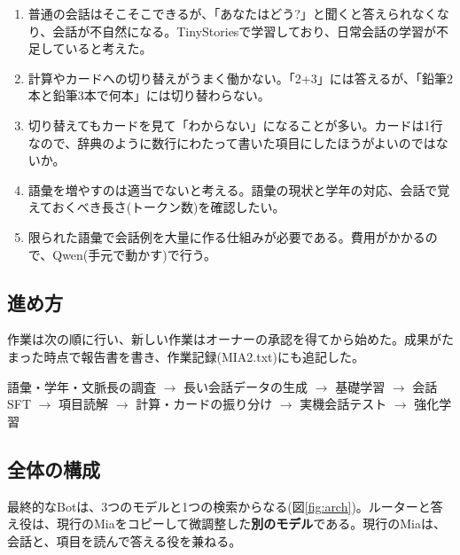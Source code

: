 \documentclass[a4paper,11pt]{article}
\begin{document}
\begin{enumerate}
\item 普通の会話はそこそこできるが、「あなたはどう?」と聞くと答えられなくなり、会話が不自然になる。TinyStoriesで学習しており、日常会話の学習が不足していると考えた。
\item 計算やカードへの切り替えがうまく働かない。「2+3」には答えるが、「鉛筆2本と鉛筆3本で何本」には切り替わらない。
\item 切り替えてもカードを見て「わからない」になることが多い。カードは1行なので、辞典のように数行にわたって書いた項目にしたほうがよいのではないか。
\item 語彙を増やすのは適当でないと考える。語彙の現状と学年の対応、会話で覚えておくべき長さ(トークン数)を確認したい。
\item 限られた語彙で会話例を大量に作る仕組みが必要である。費用がかかるので、Qwen(手元で動かす)で行う。
\end{enumerate}

\subsection{進め方}
作業は次の順に行い、新しい作業はオーナーの承認を得てから始めた。成果がたまった時点で報告書を書き、作業記録(MIA2.txt)にも追記した。
\begin{center}
\small
語彙・学年・文脈長の調査 $\rightarrow$ 長い会話データの生成 $\rightarrow$ 基礎学習 $\rightarrow$ 会話SFT $\rightarrow$ 項目読解 $\rightarrow$ 計算・カードの振り分け $\rightarrow$ 実機会話テスト $\rightarrow$ 強化学習
\end{center}

\subsection{全体の構成}
最終的なBotは、3つのモデルと1つの検索からなる(図\ref{fig:arch})。ルーターと答え役は、現行のMiaをコピーして微調整した\textbf{別のモデル}である。現行のMiaは、会話と、項目を読んで答える役を兼ねる。
\end{document}
